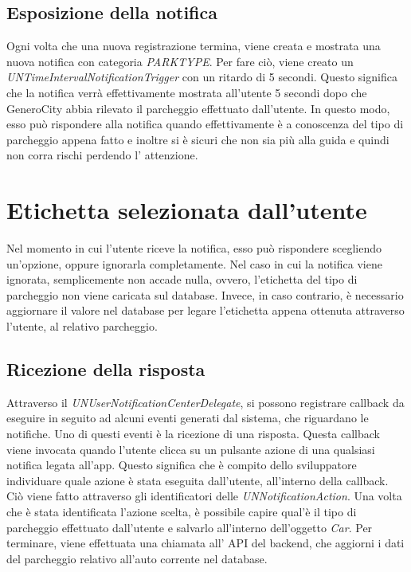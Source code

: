 \subsection{Esposizione della notifica}

Ogni volta che una nuova registrazione termina, viene creata e mostrata una nuova notifica
con categoria \emph{PARKTYPE}. Per fare ciò, viene creato un
\emph{UNTimeIntervalNotificationTrigger} con un ritardo di 5 secondi. Questo significa che
la notifica verrà effettivamente mostrata all'utente 5 secondi dopo che GeneroCity abbia
rilevato il parcheggio effettuato dall'utente. In questo modo, esso può rispondere alla
notifica quando effettivamente è a conoscenza del tipo di parcheggio appena fatto e
inoltre si è sicuri che non sia più alla guida e quindi non corra rischi perdendo l'
attenzione. %

\section{Etichetta selezionata dall'utente}

Nel momento in cui l'utente riceve la notifica, esso può rispondere scegliendo un'opzione,
oppure ignorarla completamente. Nel caso in cui la notifica viene ignorata, semplicemente 
non accade nulla, ovvero, l'etichetta del tipo di parcheggio non viene caricata sul
database. Invece, in caso contrario, è necessario aggiornare il valore nel database per 
legare l'etichetta appena ottenuta attraverso l'utente, al relativo parcheggio.

\subsection{Ricezione della risposta}

Attraverso il \emph{UNUserNotificationCenterDelegate}, si possono registrare callback 
da eseguire in seguito ad alcuni eventi generati dal sistema, che riguardano le notifiche.
Uno di questi eventi è la ricezione di una risposta. Questa callback viene invocata quando
l'utente clicca su un pulsante azione di una qualsiasi notifica legata all'app.
Questo significa che è compito dello sviluppatore individuare quale azione è stata eseguita
dall'utente, all'interno della callback. Ciò viene fatto attraverso gli identificatori
delle \emph{UNNotificationAction}. Una volta che è stata identificata l'azione scelta,
è possibile capire qual'è il tipo di parcheggio effettuato dall'utente e salvarlo
all'interno dell'oggetto \emph{Car}. Per terminare, viene effettuata una chiamata all'
API del backend, che aggiorni i dati del parcheggio relativo all'auto corrente
nel database.


